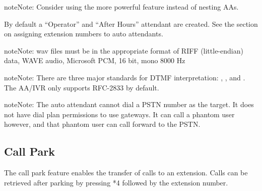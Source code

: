 \documentclass[letterpaper,10pt,english]{sphinxmanual}
\begin{document}
\begin{sphinxadmonition}{note}{Note:}
Consider using the more powerful {\hyperref[\detokenize{webui:call-queue}]{}} feature instead of nesting AAs.
\end{sphinxadmonition}

By default a “Operator” and “After Hours” attendant are created. See the {\hyperref[\detokenize{webui:dial-plans}]{}} section on assigning extension numbers to auto attendants.
\begin{quote}

\end{quote}

\begin{sphinxadmonition}{note}{Note:}
wav files must be in the appropriate format of RIFF (little-endian) data, WAVE audio, Microsoft PCM, 16 bit, mono 8000 Hz
\end{sphinxadmonition}

\begin{sphinxadmonition}{note}{Note:}
There are three major standards for DTMF interpretation: , , and . The AA/IVR only supports RFC-2833 by default.
\end{sphinxadmonition}

\begin{sphinxadmonition}{note}{Note:}
The auto attendant cannot dial a PSTN number as the target. It does not have dial plan permissions to use gateways. It can call a phantom user however, and that phantom user can call forward to the PSTN.
\end{sphinxadmonition}


\subsection{Call Park}
\label{\detokenize{webui:call-park}}\label{\detokenize{webui:id9}}
The call park feature enables the transfer of calls to an extension. Calls can be retrieved after parking by pressing *4 followed by the extension number.
\begin{quote}

\end{quote}
\end{document}
